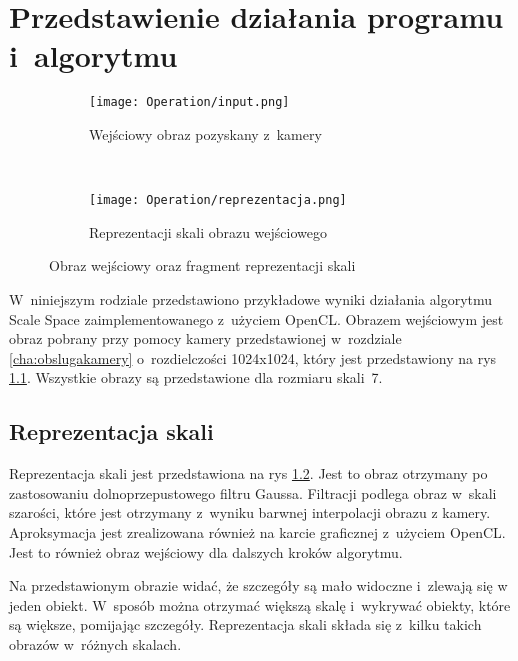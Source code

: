 \chapter{Przedstawienie działania programu i~algorytmu}
\label{cha:dzialanie}

\begin{figure}[h]
\begin{center}

\begin{subfigure}[t]{0.3\textwidth}
\texttt{[image: Operation/input.png]}
\caption{Wejściowy obraz pozyskany z~kamery}
\label{fig:input}
\end{subfigure}
~
\begin{subfigure}[t]{0.3\textwidth}
\texttt{[image: Operation/reprezentacja.png]}
\caption{Reprezentacji skali obrazu wejściowego}
\label{fig:dzialanieRep}
\end{subfigure}

\end{center}
\label{fig:inputIDzialanie}
\caption{Obraz wejściowy oraz fragment reprezentacji skali}
\end{figure}

W~niniejszym rodziale przedstawiono przykładowe wyniki działania algorytmu Scale Space zaimplementowanego z~użyciem OpenCL. Obrazem wejściowym jest obraz pobrany przy pomocy kamery przedstawionej w~rozdziale \ref{cha:obslugakamery} o~rozdielczości 1024x1024, który jest przedstawiony na rys \ref{fig:input}. Wszystkie obrazy są przedstawione dla rozmiaru skali~7.

\section{Reprezentacja skali}
\label{sec:dzialanieRep}

Reprezentacja skali jest przedstawiona na rys \ref{fig:dzialanieRep}. Jest to obraz otrzymany po zastosowaniu dolnoprzepustowego filtru Gaussa. Filtracji podlega obraz w~skali szarości, które jest otrzymany z~wyniku barwnej interpolacji obrazu z kamery. Aproksymacja jest zrealizowana również na karcie graficznej z~użyciem OpenCL. Jest to również obraz wejściowy dla dalszych kroków algorytmu.

Na przedstawionym obrazie widać, że szczegóły są mało widoczne i~zlewają się w jeden obiekt. W~sposób można otrzymać większą skalę i~wykrywać obiekty, które są większe, pomijając szczegóły. Reprezentacja skali składa się z~kilku takich obrazów w~różnych skalach.


